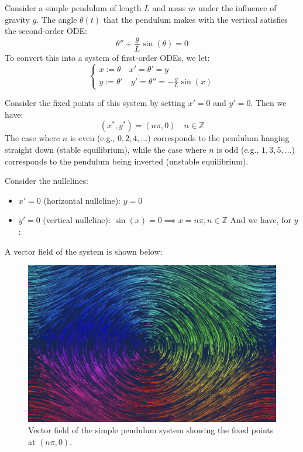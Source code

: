 \documentclass[11pt]{article}
\begin{document}
\begin{example}
    Consider a simple pendulum of length \( L \) and mass \( m \) under the influence of gravity \( g \). The angle \( \theta(t) \) that the pendulum makes with the vertical satisfies the second-order ODE:
    $$
    \theta'' + \frac{g}{L} \sin(\theta) = 0
    $$
    To convert this into a system of first-order ODEs, we let:
    $$\begin{cases}
    x := \theta  \quad x' = \theta' = y \\
    y := \theta' \quad y' = \theta'' = -\frac{g}{L} \sin(x)
    \end{cases}$$

    Consider the fixed points of this system by setting \( x' = 0 \) and \( y' = 0 \). Then we have:
    $$(x^*, y^*) = (n\pi, 0) \quad n \in \mathbb{Z}$$
    The case where \( n \) is even (e.g., \( 0, 2, 4, \ldots \)) corresponds to the pendulum hanging straight down (stable equilibrium), while the case where \( n \) is odd (e.g., \( 1, 3, 5, \ldots \)) corresponds to the pendulum being inverted (unstable equilibrium).
    
    Consider the nullclines:
    \begin{itemize}
        \item \( x' = 0 \) (horizontal nullcline): \( y = 0 \)
        \item \( y' = 0 \) (vertical nullcline): \( \sin(x) = 0 \implies x = n\pi, n \in \mathbb{Z} \) And we have, for $y$:
        
    \end{itemize}

    A vector field of the system is shown below:
        \begin{figure}[h!]
            \centering
            \includegraphics[width=0.6\linewidth]{pendulum.png}
            \caption{Vector field of the simple pendulum system showing the fixed points at \( (n\pi, 0) \).}
        \end{figure}

\end{example}
\end{document}
